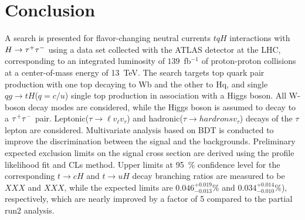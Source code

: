 \section{Conclusion}
\label{sec:conclusion}

A search is presented for flavor-changing neutral currents $tqH$ interactions with $H\to\tau^{+}\tau^{-}$ using a data set collected with the ATLAS
detector at the LHC, corresponding to an integrated luminosity of $139$~fb$^{-1}$ of proton-proton collisions at a center-of-mass energy of 13~TeV.
The search targets top quark pair production with one top decaying to Wb and the other to Hq, and single $qg \to tH$($q=c/u$) single top production in association with a Higgs boson. All W-boson decay modes are considered, while the Higgs boson is assumed to decay to a $\tau^{+}\tau^{-}$ pair. Leptonic($\tau \rightarrow \ell v_{\ell} v_{\tau}$) and hadronic($\tau \rightarrow hardrons v_{\tau}$) decays of the $\tau$ lepton are considered.
Multivariate analysis based on BDT is conducted to improve the discrimination between the signal and the backgrounds. Preliminary expected exclusion limits on the signal cross section are derived using the profile likelihood fit and CLs method. Upper limits at 95~\% confidence level for the corresponding $t\to cH$ and $t\to uH$ decay branching ratios are measured to be $XXX$ and $XXX$, while the expected limits are $0.046^{+0.019}_{-0.013}\%$ and $0.034^{+0.014}_{-0.010}\%$), respectively, which are nearly improved by a factor of 5 compared to the partial run2 analysis. 